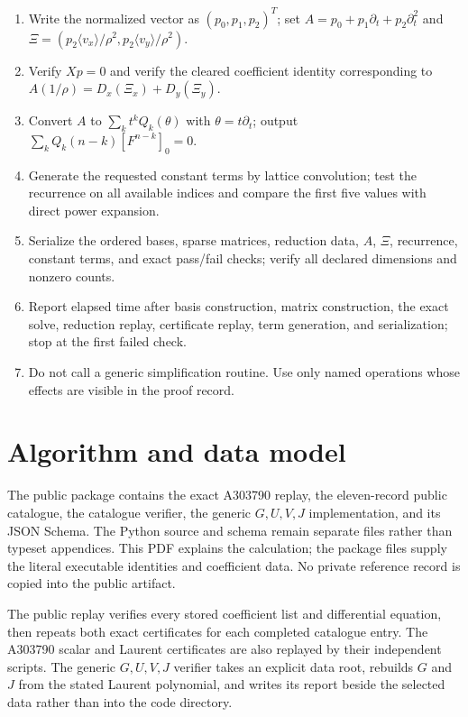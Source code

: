 \documentclass[11pt]{article}
\newcommand{\Dx}{D_x}
\newcommand{\Dy}{D_y}
\begin{document}
\begin{enumerate}[label=\texttt{\arabic*.},leftmargin=2.7em,itemsep=0.22em,topsep=0pt]
\item Write the normalized vector as $(p_0,p_1,p_2)^T$; set $A=p_0+p_1\partial_t+p_2\partial_t^2$ and $\Xi=(p_2\langle v_x\rangle/\rho^2,p_2\langle v_y\rangle/\rho^2)$.
\item Verify $Xp=0$ and verify the cleared coefficient identity corresponding to
      $A(1/\rho)=\Dx(\Xi_x)+\Dy(\Xi_y)$.
\item Convert $A$ to $\sum_k t^kQ_k(\theta)$ with $\theta=t\partial_t$; output
      $\sum_kQ_k(n-k)[F^{n-k}]_0=0$.
\item Generate the requested constant terms by lattice convolution; test the recurrence on all available indices and compare the first five values with direct power expansion.
\item Serialize the ordered bases, sparse matrices, reduction data, $A$, $\Xi$, recurrence, constant terms, and exact pass/fail checks; verify all declared dimensions and nonzero counts.
\item Report elapsed time after basis construction, matrix construction, the exact solve, reduction replay, certificate replay, term generation, and serialization; stop at the first failed check.
\item Do not call a generic simplification routine.  Use only named operations whose effects are visible in the proof record.
\end{enumerate}
\endgroup

\clearpage
\section{Algorithm and data model}

The public package contains the exact A303790 replay, the eleven-record
public catalogue, the catalogue verifier, the generic $G,U,V,J$ implementation,
and its JSON Schema.  The Python source and schema remain separate files rather
than typeset appendices.  This PDF explains the calculation; the package files
supply the literal executable identities and coefficient data.  No private
reference record is copied into the public artifact.

The public replay verifies every stored coefficient list and differential
equation, then repeats both exact certificates for each completed catalogue
entry.  The A303790 scalar and Laurent certificates are also replayed by their
independent scripts.  The generic $G,U,V,J$ verifier takes an explicit data root,
rebuilds $G$ and $J$ from the stated Laurent polynomial, and writes its report
beside the selected data rather than into the code directory.
\end{document}

